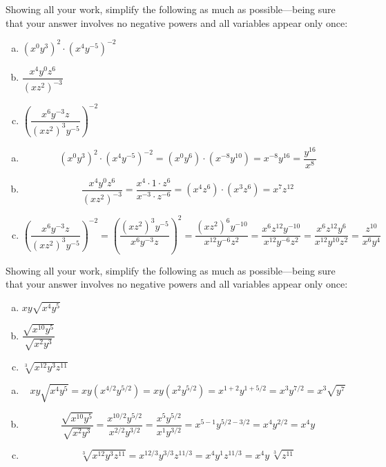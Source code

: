 \documentclass[11pt,letterpaper]{article}
\begin{document}
\newpage



 Showing all your work, simplify the following as much as possible---being sure that your answer involves no negative powers and all variables appear only once:
	\begin{enumerate}[(a)]
	\item $(x^0 y^3)^2 \cdot (x^4 y^{-5})^{-2}$
	\item $\dfrac{x^{4} y^0 z^6}{(x z^2)^{-3}}$
	\item $\left( \dfrac{x^6 y^{-3} z}{(x z^2)^3 y^{-5}} \right)^{-2}$
	\end{enumerate} \pspace

\sol
\begin{enumerate}[(a)]
\item 
	\[
	(x^0 y^3)^2 \cdot (x^4 y^{-5})^{-2}= (x^0 y^6) \cdot (x^{-8} y^{10})= x^{-8} y^{16}= \dfrac{y^{16}}{x^8}
	\] \pspace

\item 
	\[
	\dfrac{x^{4} y^0 z^6}{(x z^2)^{-3}}= \dfrac{x^4 \cdot 1 \cdot z^6}{x^{-3} \cdot z^{-6}}= (x^4 z^6) \cdot (x^3 z^6)= x^7 z^{12}
	\] \pspace

\item 
	\[
	\left( \dfrac{x^6 y^{-3} z}{(x z^2)^3 y^{-5}} \right)^{-2}= \left( \dfrac{(x z^2)^3 y^{-5}}{x^6 y^{-3} z} \right)^2= \dfrac{(xz^2)^6 y^{-10}}{x^{12} y^{-6} z^2}= \dfrac{x^6 z^{12} y^{-10}}{x^{12} y^{-6} z^2}= \dfrac{x^6 z^{12} y^6}{x^{12} y^{10} z^2}= \dfrac{z^{10}}{x^6 y^4}
	\]
\end{enumerate}



\newpage



 Showing all your work, simplify the following as much as possible---being sure that your answer involves no negative powers and all variables appear only once:
	\begin{enumerate}[(a)]
	\item $xy \sqrt{x^4 y^5}$
	\item $\dfrac{\sqrt{x^{10} y^5}}{\sqrt{x^2 y^3}}$
	\item $\sqrt[3]{x^{12} y^3 z^{11}}$
	\end{enumerate} \pspace

\sol
\begin{enumerate}[(a)]
\item 
	\[
	xy \sqrt{x^4 y^5}= xy (x^{4/2} y^{5/2})= xy (x^2 y^{5/2})= x^{1+2} y^{1 + 5/2}= x^3 y^{7/2}= x^3 \sqrt{y^7}
	\] \pspace

\item 
	\[
	\dfrac{\sqrt{x^{10} y^5}}{\sqrt{x^2 y^3}}= \dfrac{x^{10/2} y^{5/2}}{x^{2/2} y^{3/2}}= \dfrac{x^5 y^{5/2}}{x^1 y^{3/2}}= x^{5-1} y^{5/2 - 3/2}= x^4 y^{2/2}= x^4 y
	\] \pspace

\item 
	\[
	\sqrt[3]{x^{12} y^3 z^{11}}= x^{12/3} y^{3/3} z^{11/3}= x^4 y^1 z^{11/3}= x^4 y\, \sqrt[3]{z^{11}}
	\]
\end{enumerate}
\end{document}
